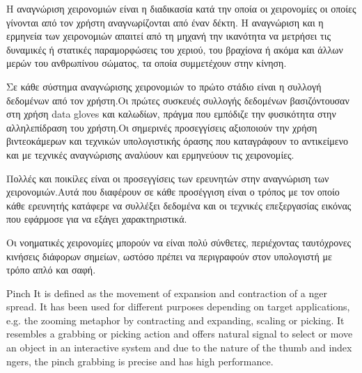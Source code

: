 H αναγνώριση χειρονομιών είναι η διαδικασία κατά την οποία οι χειρονομίες οι οποίες γίνονται από τον χρήστη αναγνωρίζονται από έναν δέκτη. Η αναγνώριση και η ερμηνεία των χειρονομιών απαιτεί από τη μηχανή την ικανότητα να μετρήσει τις δυναμικές ή στατικές παραμορφώσεις του χεριού, του βραχίονα ή ακόμα και άλλων μερών του ανθρωπίνου σώματος, τα οποία συμμετέχουν στην κίνηση.

Σε κάθε σύστημα αναγνώρισης χειρονομιών το πρώτο στάδιο είναι η συλλογή δεδομένων από τον χρήστη.Οι πρώτες συσκευές συλλογής δεδομένων βασιζόντουσαν στη χρήση data gloves και καλωδίων, πράγμα που εμπόδιζε την φυσικότητα στην αλληλεπίδραση του χρήστη.Οι σημερινές προσεγγίσεις αξιοποιούν την χρήση βιντεοκάμερων και τεχνικών υπολογιστικής όρασης που καταγράφουν το αντικείμενο και με τεχνικές αναγνώρισης αναλύουν και ερμηνεύουν τις χειρονομίες.

Πολλές και ποικίλες είναι οι προσεγγίσεις των ερευνητών στην αναγνώριση των χειρονομιών.Αυτά που διαφέρουν σε κάθε προσέγγιση είναι ο τρόπος με τον οποίο κάθε ερευνητής κατάφερε να συλλέξει δεδομένα και οι τεχνικές επεξεργασίας εικόνας που εφάρμοσε για να εξάγει χαρακτηριστικά.

Οι νοηματικές χειρονομίες μπορούν να είναι πολύ σύνθετες, περιέχοντας ταυτόχρονες κινήσεις διάφορων σημείων, ωστόσο πρέπει να περιγραφούν στον υπολογιστή με τρόπο απλό και σαφή.

Pinch It is defined as the movement of expansion and contraction of a nger spread. It has been used for different purposes depending on target applications, e.g. the zooming metaphor by contracting and expanding, scaling or picking. It resembles a grabbing or picking action and offers natural signal to select or move an object in an interactive system and due to the nature of the thumb and index ngers, the pinch grabbing is precise and has high performance.


